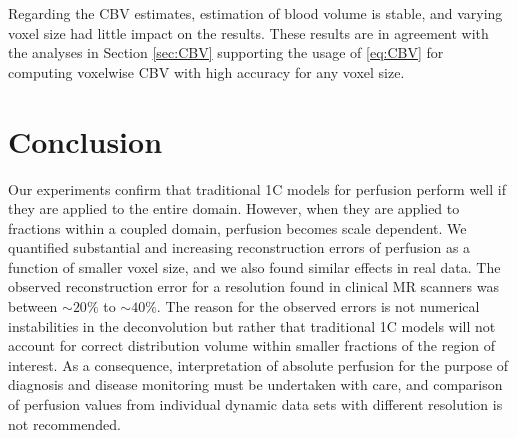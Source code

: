 \documentclass[10pt]{article}
\begin{document}
Regarding the CBV estimates, estimation of blood volume is stable, and varying voxel size had little impact on the results. These results are in agreement with the analyses in Section \ref{sec:CBV} supporting the usage of \eqref{eq:CBV} for computing voxelwise CBV with high accuracy for any voxel size.
	


\section{Conclusion}

Our experiments confirm that traditional 1C models for perfusion perform well if they are applied to the entire domain.
	However, when they are applied to fractions within a coupled domain, perfusion becomes scale dependent.
	We quantified substantial and increasing reconstruction errors of perfusion as a function of smaller voxel size, and we also found similar effects in real data. The observed reconstruction error for a resolution found in clinical MR scanners was between $\sim$$20\%$ to $\sim$$40\%$. The reason for the observed errors is not numerical instabilities in the deconvolution but rather that traditional 1C models will not account for correct distribution volume within smaller fractions of the region of interest. As a consequence, interpretation of absolute perfusion for the purpose of diagnosis and disease monitoring must be undertaken with care, and comparison of perfusion values from individual dynamic data sets with different resolution is not recommended. 


\end{document}
